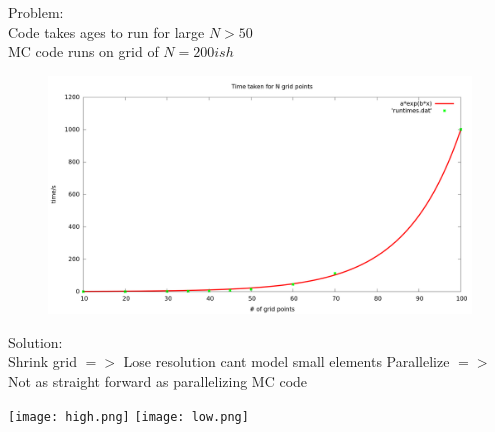 \documentclass{beamer}
\begin{document}
\begin{frame}
Problem:\\
Code takes ages to run for large $N>50$ \\
MC code runs on grid of $N=200ish$
\begin{figure}
\centering
\includegraphics[scale=.17]{time.png}

\end{figure}
\end{frame}

\begin{frame}
Solution:\\
Shrink grid $=>$ Lose resolution cant model small elements
Parallelize $=>$ Not as straight forward as parallelizing MC code

\texttt{[image: high.png]}
\hskip 1cm
\texttt{[image: low.png]}
\end{frame}
\end{document}
